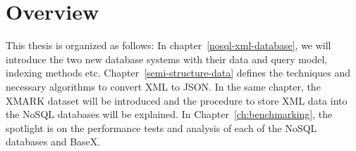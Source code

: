 		
	\section{Overview }
		This thesis is organized as follows: In chapter~\ref{nosql-xml-database}, we will introduce the two new database systems with their data and query model, indexing methods etc. Chapter~\ref{semi-structure-data} defines the techniques and necessary algorithms to convert XML to JSON. In the same chapter, the XMARK dataset will be introduced and the procedure to store XML data into the NoSQL databases will be explained. In Chapter~\ref{ch:benchmarking}, the spotlight is on the performance tests and analysis of each of the NoSQL databases and BaseX.